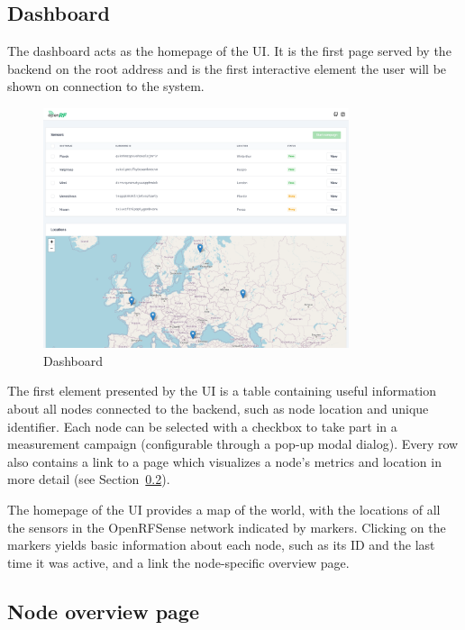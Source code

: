 \documentclass[
  letterpaper,
  a4paper,
  12pt,
  titlepage,
  oneside,
  openany]{book}
\begin{document}
\hypertarget{dashboard}{%
\subsection{Dashboard}\label{dashboard}}

The dashboard acts as the homepage of the UI. It is the first page
served by the backend on the root address and is the first interactive
element the user will be shown on connection to the system.

\begin{figure}[h!]

{\centering \includegraphics[width=0.8\textwidth,height=\textheight]{assets/screenshots/dashboard.pdf}

}

\caption{Dashboard}

\end{figure}

The first element presented by the UI is a table containing useful
information about all nodes connected to the backend, such as node
location and unique identifier. Each node can be selected with a
checkbox to take part in a measurement campaign (configurable through a
pop-up modal dialog). Every row also contains a link to a page which
visualizes a node's metrics and location in more detail (see
Section~\ref{sec-nodeOverview}).

The homepage of the UI provides a map of the world, with the locations
of all the sensors in the OpenRFSense network indicated by markers.
Clicking on the markers yields basic information about each node, such
as its ID and the last time it was active, and a link the node-specific
overview page.

\hypertarget{sec-nodeOverview}{%
\subsection{Node overview page}\label{sec-nodeOverview}}
\end{document}
